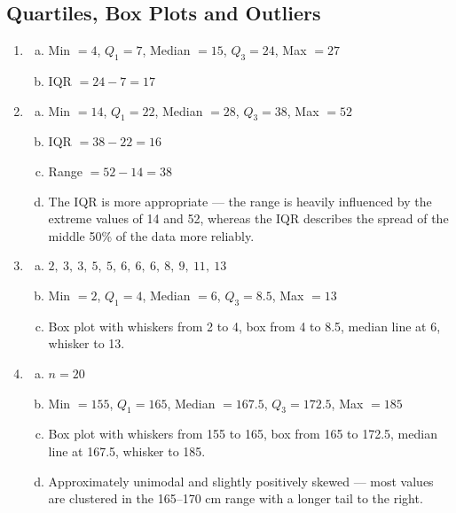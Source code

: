 \documentclass{article}
\begin{document}
\subsection{Quartiles, Box Plots and Outliers}
\begin{enumerate}

  \item
  \begin{enumerate}[(a)]
    \item Min $= 4$, $Q_1 = 7$, Median $= 15$, $Q_3 = 24$, Max $= 27$
    \item IQR $= 24 - 7 = 17$
  \end{enumerate}

  \item
  \begin{enumerate}[(a)]
    \item Min $= 14$, $Q_1 = 22$, Median $= 28$, $Q_3 = 38$, Max $= 52$
    \item IQR $= 38 - 22 = 16$
    \item Range $= 52 - 14 = 38$
    \item The IQR is more appropriate --- the range is heavily influenced by the extreme values
    of 14 and 52, whereas the IQR describes the spread of the middle 50\% of the data more
    reliably.
  \end{enumerate}

  \item
  \begin{enumerate}[(a)]
    \item $2,\ 3,\ 3,\ 5,\ 5,\ 6,\ 6,\ 6,\ 8,\ 9,\ 11,\ 13$
    \item Min $= 2$, $Q_1 = 4$, Median $= 6$, $Q_3 = 8.5$, Max $= 13$
    \item Box plot with whiskers from 2 to 4, box from 4 to 8.5, median line at 6, whisker to 13.
  \end{enumerate}

  \item
  \begin{enumerate}[(a)]
    \item $n = 20$
    \item Min $= 155$, $Q_1 = 165$, Median $= 167.5$, $Q_3 = 172.5$, Max $= 185$
    \item Box plot with whiskers from 155 to 165, box from 165 to 172.5, median line at 167.5,
    whisker to 185.
    \item Approximately unimodal and slightly positively skewed --- most values are clustered in
    the 165--170 cm range with a longer tail to the right.
  \end{enumerate}


\end{enumerate}
\end{document}

